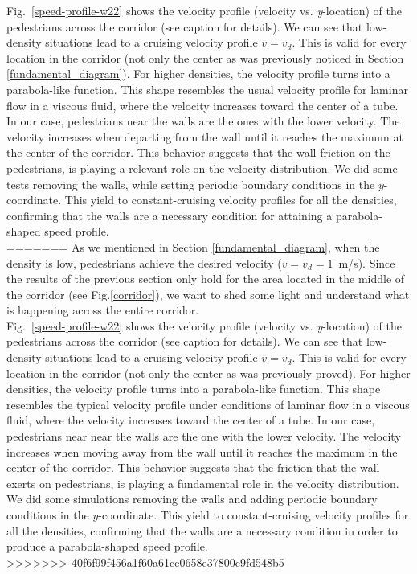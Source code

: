 Fig.~\ref{speed-profile-w22} shows the velocity profile (velocity vs. \textit{y}-location) of the pedestrians across the corridor (see caption for details). We can see that low-density situations lead to a cruising velocity profile $v=v_d$. This is valid for every location in the corridor (not only the center as was previously noticed in Section \ref{fundamental_diagram}). For higher densities, the velocity profile turns into a parabola-like function. This shape resembles the usual velocity profile for laminar flow in a viscous fluid, where the velocity increases toward the center of a tube. In our case, pedestrians near the walls are the ones with the lower velocity. The velocity increases when departing from the wall until it reaches the maximum at the center of the corridor. This behavior suggests that the wall friction on the pedestrians, is playing a relevant role on the velocity distribution. We did some tests removing the walls, while setting periodic boundary conditions in the $y$-coordinate. This yield to constant-cruising velocity profiles for all the densities, confirming that the walls are a necessary condition for attaining a parabola-shaped speed profile.\\
=======
As we mentioned in Section \ref{fundamental_diagram}, when the density is low, pedestrians achieve the desired velocity ($v=v_d=1$~m/s). Since the results of the previous section only hold for the area located in the middle of the corridor (see Fig.\ref{corridor}), we want to shed some light and understand what is happening across the entire corridor.\\

Fig.~\ref{speed-profile-w22} shows the velocity profile (velocity vs. \textit{y}-location) of the pedestrians across the corridor (see caption for details). We can see that low-density situations lead to a cruising velocity profile $v=v_d$. This is valid for every location in the corridor (not only the center as was previously proved). For higher densities, the velocity profile turns into a parabola-like function. This shape resembles the typical velocity profile under conditions of laminar flow in a viscous fluid, where the velocity increases toward the center of a tube. In our case, pedestrians near near the walls are the one with the lower velocity. The velocity increases when moving away from the wall until it reaches the maximum in the center of the corridor. This behavior suggests that the friction that the wall exerts on pedestrians, is playing a fundamental role in the velocity distribution. We did some simulations removing the walls and adding periodic boundary conditions in the $y$-coordinate. This yield to constant-cruising velocity profiles for all the densities, confirming that the walls are a necessary condition in order to produce a parabola-shaped speed profile.\\
>>>>>>> 40f6f99f456a1f60a61ce0658e37800c9fd548b5

